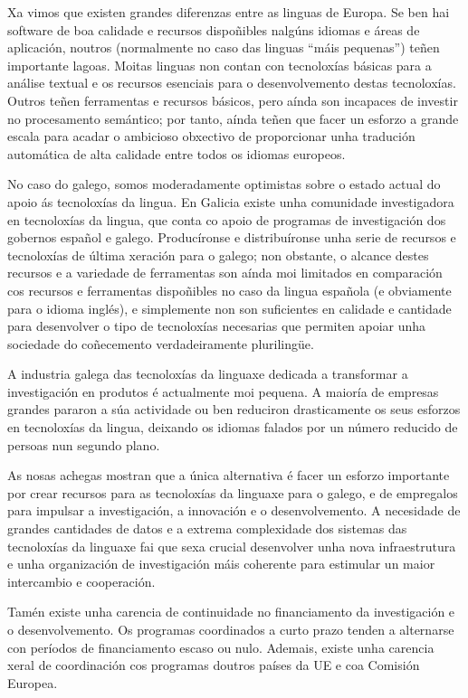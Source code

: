 \begin{multicols}{2}
Xa vimos que existen grandes diferenzas entre as linguas de Europa. Se ben hai software de boa calidade e recursos dispoñibles nalgúns idiomas e áreas de aplicación, noutros (normalmente no caso das linguas “máis pequenas”) teñen importante lagoas. Moitas linguas non contan con tecnoloxías básicas para a análise textual e os recursos esenciais para o desenvolvemento destas tecnoloxías. Outros teñen ferramentas e recursos básicos, pero aínda son incapaces de investir no procesamento semántico; por tanto, aínda teñen que facer un esforzo a grande escala para acadar o ambicioso obxectivo de proporcionar unha tradución automática de alta calidade entre todos os idiomas europeos.

No caso do galego, somos moderadamente optimistas sobre o estado actual do apoio ás tecnoloxías da lingua. En Galicia existe unha comunidade investigadora en tecnoloxías da lingua, que conta co apoio de programas de investigación dos gobernos español e galego. Producíronse e distribuíronse unha serie de recursos e tecnoloxías de última xeración para o galego; non obstante, o alcance destes recursos e a variedade de ferramentas son aínda moi limitados en comparación cos recursos e ferramentas dispoñibles no caso da lingua española (e obviamente para o idioma inglés), e simplemente non son suficientes en calidade e cantidade para desenvolver o tipo de tecnoloxías necesarias que permiten apoiar unha sociedade do coñecemento verdadeiramente plurilingüe.

A industria galega das tecnoloxías da linguaxe dedicada a transformar a investigación en produtos é actualmente moi pequena. A maioría de empresas grandes pararon a súa actividade ou ben reduciron drasticamente os seus esforzos en tecnoloxías da lingua, deixando os idiomas falados por un número reducido de persoas nun segundo plano.

As nosas achegas mostran que a única alternativa é facer un esforzo importante por crear recursos para as tecnoloxías da linguaxe para o galego, e de empregalos para impulsar a investigación, a innovación e o desenvolvemento. A necesidade de grandes cantidades de datos e a extrema complexidade dos sistemas das tecnoloxías da linguaxe fai que sexa crucial desenvolver unha nova infraestrutura e unha organización de investigación máis coherente para estimular un maior intercambio e cooperación.

Tamén existe unha carencia de continuidade no financiamento da investigación e o desenvolvemento. Os programas coordinados a curto prazo tenden a alternarse con períodos de financiamento escaso ou nulo. Ademais, existe unha carencia xeral de coordinación cos programas doutros países da UE e coa Comisión Europea.


\end{multicols}
